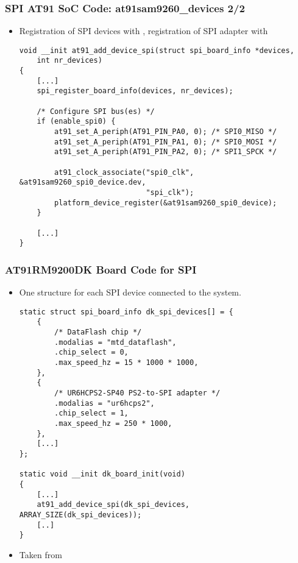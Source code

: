 \begin{frame}[fragile]
  \frametitle{SPI AT91 SoC Code: at91sam9260\_devices 2/2}
  \begin{itemize}
  \item Registration of SPI devices with
    , registration of SPI adapter with
  \begin{verbatim}
void __init at91_add_device_spi(struct spi_board_info *devices,
    int nr_devices)
{
    [...]
    spi_register_board_info(devices, nr_devices);

    /* Configure SPI bus(es) */
    if (enable_spi0) {
        at91_set_A_periph(AT91_PIN_PA0, 0); /* SPI0_MISO */
        at91_set_A_periph(AT91_PIN_PA1, 0); /* SPI0_MOSI */
        at91_set_A_periph(AT91_PIN_PA2, 0); /* SPI1_SPCK */

        at91_clock_associate("spi0_clk", &at91sam9260_spi0_device.dev,
                             "spi_clk");
        platform_device_register(&at91sam9260_spi0_device);
    }

    [...]
}
  \end{verbatim}
  \end{itemize}
\end{frame}

\begin{frame}[fragile]
  \frametitle{AT91RM9200DK Board Code for SPI}
  \begin{itemize}
  \item One  structure for each SPI device
    connected to the system.
  \begin{verbatim}
static struct spi_board_info dk_spi_devices[] = {
    {
        /* DataFlash chip */
        .modalias = "mtd_dataflash",
        .chip_select = 0,
        .max_speed_hz = 15 * 1000 * 1000,
    },
    {
        /* UR6HCPS2-SP40 PS2-to-SPI adapter */
        .modalias = "ur6hcps2",
        .chip_select = 1,
        .max_speed_hz = 250 * 1000,
    },
    [...]
};

static void __init dk_board_init(void)
{
    [...]
    at91_add_device_spi(dk_spi_devices, ARRAY_SIZE(dk_spi_devices));
    [..]
}
  \end{verbatim}
  \item Taken from 
  \end{itemize}
\end{frame}


